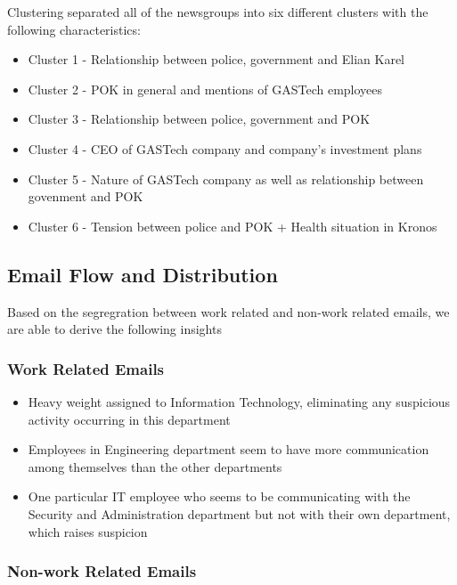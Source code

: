 \documentclass{acm_proc_article-sp}
\providecommand{\tightlist}{%
  \setlength{\itemsep}{0pt}\setlength{\parskip}{0pt}}
\begin{document}
Clustering separated all of the newsgroups into six different clusters
with the following characteristics:

\begin{itemize}
\item
  Cluster 1 - Relationship between police, government and Elian Karel
\item
  Cluster 2 - POK in general and mentions of GASTech employees
\item
  Cluster 3 - Relationship between police, government and POK
\item
  Cluster 4 - CEO of GASTech company and company's investment plans
\item
  Cluster 5 - Nature of GASTech company as well as relationship between
  govenment and POK
\item
  Cluster 6 - Tension between police and POK + Health situation in
  Kronos
\end{itemize}

\hypertarget{email-flow-and-distribution}{%
\subsection{Email Flow and
Distribution}\label{email-flow-and-distribution}}

Based on the segregration between work related and non-work related
emails, we are able to derive the following insights

\hypertarget{work-related-emails}{%
\subsubsection{Work Related Emails}\label{work-related-emails}}

\begin{itemize}
\tightlist
\item
  Heavy weight assigned to Information Technology, eliminating any
  suspicious activity occurring in this department
\item
  Employees in Engineering department seem to have more communication
  among themselves than the other departments
\item
  One particular IT employee who seems to be communicating with the
  Security and Administration department but not with their own
  department, which raises suspicion
\end{itemize}

\hypertarget{non-work-related-emails}{%
\subsubsection{Non-work Related Emails}\label{non-work-related-emails}}
\end{document}
